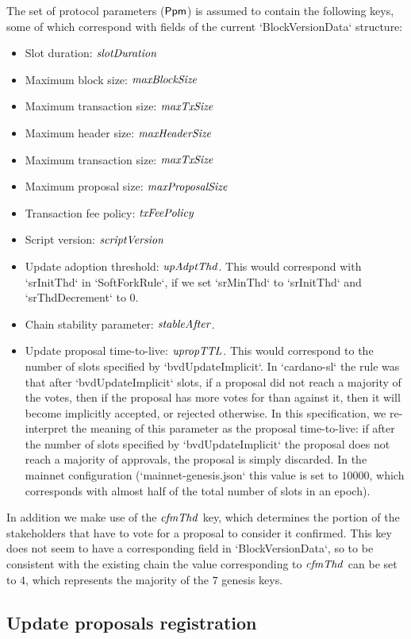 The set of protocol parameters ($\mathsf{Ppm}$) is assumed to contain the following
keys, some of which correspond with fields of the current `BlockVersionData`
structure:
\begin{itemize}
\item Slot duration: $\mathit{slotDuration}$
\item Maximum block size: $\mathit{maxBlockSize}$
\item Maximum transaction size: $\mathit{maxTxSize}$
\item Maximum header size: $\mathit{maxHeaderSize}$
\item Maximum transaction size: $\mathit{maxTxSize}$
\item Maximum proposal size: $\mathit{maxProposalSize}$
\item Transaction fee policy: $\mathit{txFeePolicy}$
\item Script version: $\mathit{scriptVersion}$
\item Update adoption threshold: $\mathit{upAdptThd}$. This would correspond with
  `srInitThd` in `SoftForkRule`, if we set `srMinThd` to `srInitThd` and
  `srThdDecrement` to $0$.
\item Chain stability parameter: $\mathit{stableAfter}$.
\item Update proposal time-to-live: $\mathit{upropTTL}$. This would correspond to
  the number of slots specified by `bvdUpdateImplicit`. In `cardano-sl` the
  rule was that after `bvdUpdateImplicit` slots, if a proposal did not reach a
  majority of the votes, then if the proposal has more votes for than against
  it, then it will become implicitly accepted, or rejected otherwise. In this
  specification, we re-interpret the meaning of this parameter as the proposal
  time-to-live: if after the number of slots specified by `bvdUpdateImplicit`
  the proposal does not reach a majority of approvals, the proposal is simply
  discarded. In the mainnet configuration (`mainnet-genesis.json` this value is
  set to $10000$, which corresponds with almost half of the total number of
  slots in an epoch).
\end{itemize}
In addition we make use of the $\mathit{cfmThd}$ key, which determines the portion
of the stakeholders that have to vote for a proposal to consider it confirmed.
This key does not seem to have a corresponding field in `BlockVersionData`, so
to be consistent with the existing chain the value corresponding to
$\mathit{cfmThd}$ can be set to $4$, which represents the majority of the $7$
genesis keys.

\subsection{Update proposals registration}
\label{sec:update-proposals-registration}

